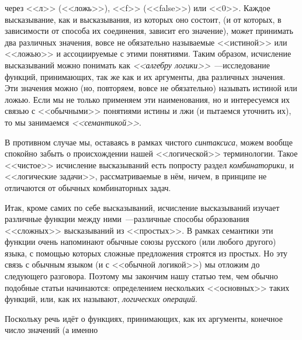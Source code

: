 
\begin{minipage}{.39\textwidth}
    через <<л>> (<<ложь>>), <<f>> (<<false>>) или <<0>>. Каждое высказывание, как и высказывания, из которых оно состоит, (и от которых, в зависимости от способа их соединения, зависит его значение), может принимать два различных значения, вовсе не обязательно называемые <<истиной>> или <<ложью>> и ассоциируемые с этими понятиями. Таким образом, исчисление высказываний можно понимать как \emph{<<алгебру логики>>}~---исследование функций, принимающих, так же как и их аргументы, два различных значения. Эти значения можно (но, повторяем, вовсе не обязательно) называть истиной или ложью. Если мы не только применяем эти наименования, но и интересуемся их связью с <<обычными>> понятиями истины и лжи (и пытаемся уточнить их), то мы занимаемся \emph{<<семантикой>>}.

    \hspace{0.5cm}В противном случае мы, оставаясь в рамках чистого \emph{синтаксиса}, можем вообще спокойно забыть о происхождении нашей <<логической>> терминологии. Такое <<чистое>> исчисление высказываний есть попросту раздел \emph{комбинаторики}, и <<логические задачи>>, рассматриваемые в нём, ничем, в принципе не отличаются от обычных комбинаторных задач.

    \hspace{0.5cm}Итак, кроме самих по себе высказываний, исчисление высказываний изучает различные функции между ними~---различные способы образования <<сложных>> высказываний из <<простых>>. В рамках семантики эти функции очень напоминают обычные союзы русского (или любого другого) языка, с помощью которых сложные предложения строятся из простых. Но эту связь с обычным языком (и с <<обычной логикой>>) мы отложим до следующего разговора. Поэтому мы закончим нашу статью тем, чем обычно подобные статьи начинаются: определением нескольких <<основных>> таких функций, или, как их называют, \emph{логических операций}.

    \hspace{0.5cm}Поскольку речь идёт о функциях, принимающих, как их аргументы, конечное число значений (а именно
\end{minipage}
\hspace{0.5cm}
